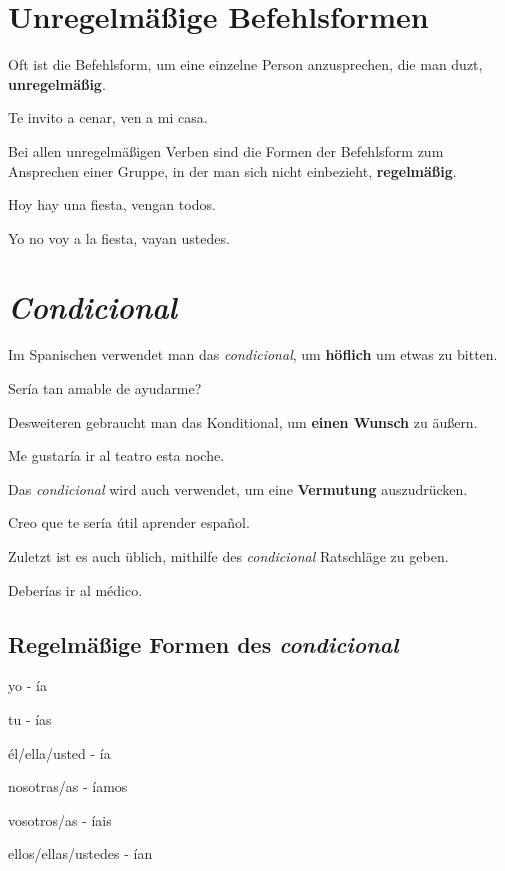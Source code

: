\section{Unregelmäßige Befehlsformen}
Oft ist die Befehlsform, um eine einzelne Person anzusprechen,
die man duzt, \textbf{unregelmäßig}.
\begin{ejemplos}
    \item Te invito a cenar, ven a mi casa.
\end{ejemplos}
Bei allen unregelmäßigen Verben sind die Formen der Befehlsform
zum Ansprechen einer Gruppe, in der man sich nicht einbezieht,
\textbf{regelmäßig}.
\begin{ejemplos}
    \item Hoy hay una fiesta, vengan todos.
    \item Yo no voy a la fiesta, vayan ustedes.
\end{ejemplos}
\section{\textit{Condicional}}
Im Spanischen verwendet man das \textit{condicional}, um 
\textbf{höflich} um etwas zu bitten.
\begin{ejemplos}
    \item Ser\'ia tan amable de ayudarme?
\end{ejemplos}
Desweiteren gebraucht man das Konditional, um 
\textbf{einen Wunsch} zu äußern.
\begin{ejemplos}
    \item Me gustar\'ia ir al teatro esta noche.
\end{ejemplos}
Das \textit{condicional} wird auch verwendet, um 
eine \textbf{Vermutung} auszudrücken.
\begin{ejemplos}
    \item Creo que te ser\'ia \'util aprender espa\~nol.
\end{ejemplos}
Zuletzt ist es auch üblich, mithilfe des \textit{condicional}
Ratschläge zu geben.
\begin{ejemplos}
    \item Deber\'ias ir al m\'edico.
\end{ejemplos}
\subsection*{Regelmäßige Formen des \textit{condicional}}
\begin{gramatica}
    \item yo - \'ia
    \item tu - \'ias
    \item \'el/ella/usted - \'ia
    \item nosotras/as - \'iamos
    \item vosotros/as - \'iais
    \item ellos/ellas/ustedes - \'ian
\end{gramatica}
